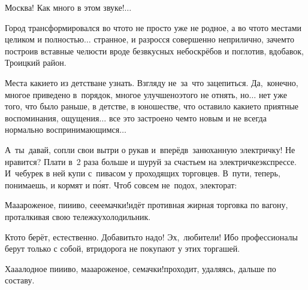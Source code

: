 %

\diagdash Москва! Как много в этом звуке!$\ldots$ 

Город трансформировался во что\sdash то не просто уже не родное, а во что\sdash то местами целиком и полностью$\ldots$ странное, и разросся совершенно неприлично, зачем\sdash то построив вставные челюсти вроде безвкусных небоскрёбов и поглотив, вдобавок, Троицкий район. 

Места какие\sdash то из детства\mdash не узнать. Взгляду не~за~что зацепиться. Да,~конечно, многое приведено в~порядок, многое улучшено\mdash этого не отнять, но$\ldots$ нет уже того, что было раньше, в детстве, в юношестве, что оставило какие\sdash то приятные воспоминания, ощущения$\ldots$ все это застроено чем\sdash то новым и не всегда нормально воспринимающимся$\ldots$

А~ты~давай, сопли свои вытри о рукав и~вперёд\mdash в~занюханную электричку! Не нравится? Плати в~2 раза больше и шуруй за счастьем на электричке\sdash экспрессе. И~чебурек в ней купи с~пивасом у проходящих торговцев. В~пути, теперь, понимаешь, и кормят и п\'{о}ят. Чтоб совсем не~подох, электорат:

\diagdash Ма\sdash а\sdash ароженое, пи\sdash и\sdash иво, се\sdash е\sdash емачки!\mdash идёт противная жирная торговка по вагону, проталкивая свою тележку\sdash холодильник.

Кто\sdash то берёт, естественно. Добавить\sdash то надо! Эх,~любители! Ибо профессионалы берут только с собой, втридорога не покупают у этих торгашей.

\diagdash Ха\sdash а\sdash алодное пи\sdash и\sdash иво, ма\sdash а\sdash ароженое, семачки!\mdash проходит, удаляясь, дальше по составу.


